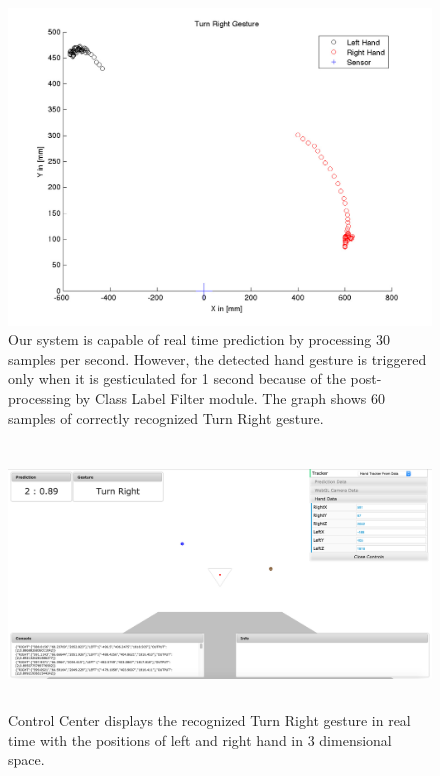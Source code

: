 \begin{figure}
	[h] \hspace{-15 mm} \centering 
	\includegraphics[width=155mm]{figures/result/test-turn-right.jpg} \caption{Our system is capable of real time prediction by processing 30 samples per second. However, the detected hand gesture is triggered only when it is gesticulated for 1 second because of the post-processing by Class Label Filter module. The graph shows 60 samples of correctly recognized Turn Right gesture. } \label{res:pl:turn:right} 
\end{figure}
\begin{figure}
	[h] \centering 
	\includegraphics[height=70mm]{figures/result/cc-turn-right.jpg} \caption{Control Center displays the recognized Turn Right gesture in real time with the positions of left and right hand in 3 dimensional space.} \label{res:cc:turn:right} 
\end{figure}
